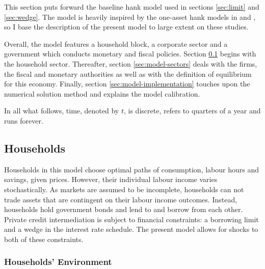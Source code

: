 \documentclass[12pt]{article} %
\numberwithin{equation}{section} %
\begin{document}
This section puts forward the baseline \Gls{hank} model used in sections \ref{sec:limit} and \ref{sec:wedge}. The model is heavily inspired by the one-asset \Gls{hank} models in \textcite{auclert2021} and \textcite{boehl2023econpizza}, so I base the description of the present model to large extent on these studies.

Overall, the model features a household block, a corporate sector and a government which conducts monetary and fiscal policies. Section \ref{sec:model-hh} begins with the household sector. Thereafter, section \ref{sec:model-sectors} deals with the firms, the fiscal and monetary authorities as well as with the definition of equilibrium for this economy. Finally, section \ref{sec:model-implementation} touches upon the numerical solution method and explains the model calibration. 

In all what follows, time, denoted by $t$, is discrete, refers to quarters of a year and runs forever.

\subsection{Households}
\label{sec:model-hh}

Households in this model choose optimal paths of consumption, labour hours and savings, given prices. However, their individual labour income varies stochastically. As markets are assumed to be incomplete, households can not trade assets that are contingent on their labour income outcomes. Instead, households hold government bonds and lend to and borrow from each other. Private credit intermediation is subject to financial constraints: a borrowing limit and a wedge in the interest rate schedule. The present model allows for shocks to both of these constraints.

\subsubsection{Households' Environment}
\label{sec:model-hh-environment}
\end{document}
